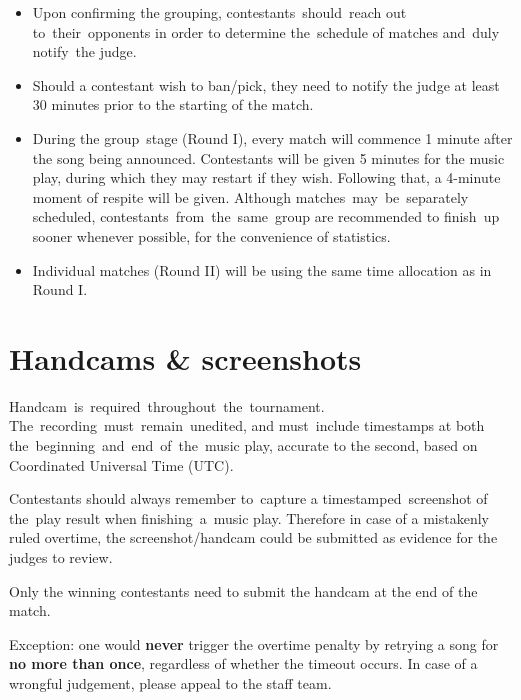 \documentclass{article}
\begin{document}
\begin{itemize}

	\item Upon confirming the grouping,
	      contestants should reach out to their opponents
	      in order to determine the schedule of matches
	      and duly notify the judge.

	\item Should a contestant wish to ban/pick,
	      they need to notify the judge at least 30 minutes
	      prior to the starting of the match.

	\item During the group stage (Round I),
	      every match will commence 1 minute
	      after the song being announced.
	      Contestants will be given 5 minutes for the music play,
	      during which they may restart if they wish.
	      Following that, a 4-minute moment of respite will be given.
	      Although matches may be separately scheduled,  %
	      contestants from the same group are recommended
	      to finish up sooner whenever possible,
	      for the convenience of statistics.  %

	\item Individual matches (Round II) will be using the same time allocation as in Round I.
\end{itemize}

\section{Handcams \& screenshots}

Handcam is required throughout the tournament.
The recording must remain unedited,
and must include timestamps
at both the beginning and end of the music play,
accurate to the second,
based on Coordinated Universal Time (UTC).

Contestants should always remember to capture
a timestamped screenshot of the play result
when finishing a music play.
Therefore in case of a mistakenly ruled overtime,
the screenshot/handcam could be
submitted as evidence for the judges to review.

Only the winning contestants need to submit the handcam
at the end of the match.

Exception: one would \textbf{never}
trigger the overtime penalty
by retrying a song
for \textbf{no more than once},
regardless of whether the timeout occurs.
In case of a wrongful judgement,
please appeal to the staff team.
\end{document}
